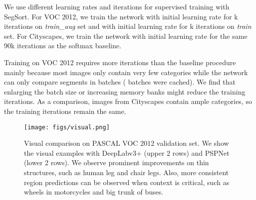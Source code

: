 \documentclass[10pt,twocolumn,letterpaper]{article}
\begin{document}
We use different learning rates and iterations for supervised training with SegSort. For VOC 2012, we train the network with initial learning rate  for k iterations on {\it train\_aug} set and with initial learning rate  for k iterations on {\it train} set. For Cityscapes, we train the network with initial learning rate  for the same 90k iterations as the softmax baseline.

Training on VOC 2012 requires more iterations than the baseline procedure mainly because most images only contain very few categories while the network can only compare segments in  batches ( batches were cached). We find that enlarging the batch size or increasing memory banks might reduce the training iterations. As a comparison, images from Cityscapes contain ample categories, so the training iterations remain the same.









\begin{table*}[t]
  \centering
    \vspace{0.5pt}
    \caption{Per-class results on Cityscapes validation set. We conclude that network trained with SegSort outperforms Softmax consistently.}
    \label{tab:cityscapes}
\end{table*}


\begin{figure}
    \centering
    \texttt{[image: figs/visual.png]}
    \caption{Visual comparison on PASCAL VOC 2012 validation set. We show the visual examples with DeepLabv3+ (upper 2 rows) and PSPNet (lower 2 rows). We observe prominent improvements on thin structures, such as human leg and chair legs. Also, more consistent region predictions can be observed when context is critical, such as wheels in motorcycles and big trunk of buses.}
    \label{fig:visual}
\end{figure}
\end{document}
